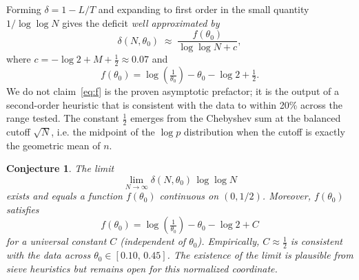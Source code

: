 \documentclass[11pt]{article}
\newtheorem{conjecture}{Conjecture}
\theoremstyle{definition}
\begin{document}
Forming \(\delta = 1 - L/T\) and expanding to first order in the small quantity
\(1/\log\log N\) gives the deficit \emph{well approximated by}
\begin{equation}\label{eq:prefactor}
  \delta(N,\theta_0) \;\approx\;
  \frac{f(\theta_0)}{\log\log N + c},
\end{equation}
where \(c = -\log 2 + M + \tfrac{1}{2} \approx 0.07\) and
\begin{equation}\label{eq:f}
  f(\theta_0) = \log\!\left(\tfrac{1}{\theta_0}\right) - \theta_0 - \log 2
  + \tfrac{1}{2}.
\end{equation}
We do not claim~\eqref{eq:f} is the proven asymptotic prefactor; it is the output of
a second-order heuristic that is consistent with the data to within 20\% across the
range tested.  The constant \(\tfrac12\) emerges from the Chebyshev sum at the
balanced cutoff \(\sqrt{N}\), i.e. the midpoint of the \(\log p\) distribution when
the cutoff is exactly the geometric mean of \(n\).

\begin{conjecture}\label{conj:prefactor}
The limit
\[
\lim_{N\to\infty} \delta(N,\theta_0)\,\log\log N
\]
exists and equals a function \(f(\theta_0)\) continuous on \((0,1/2)\).  Moreover,
\(f(\theta_0)\) satisfies
\[
  f(\theta_0) = \log\!\left(\tfrac{1}{\theta_0}\right) - \theta_0 - \log 2 + C
\]
for a universal constant \(C\) (independent of \(\theta_0\)).  Empirically,
\(C \approx \tfrac{1}{2}\) is consistent with the data across
\(\theta_0 \in [0.10,\,0.45]\).  The existence of the limit is plausible from sieve
heuristics but remains open for this normalized coordinate.
\end{conjecture}
\end{document}
